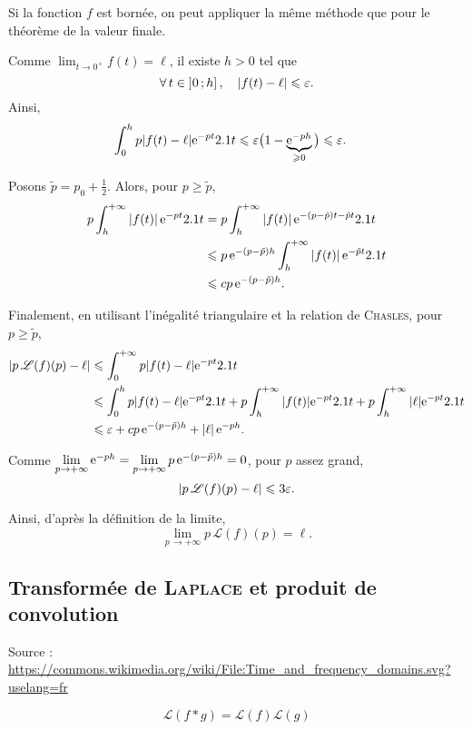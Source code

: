 \begin{solution}
\begin{reponses}
\item  Si la fonction $f$ est bornée, on peut appliquer la même méthode que pour le théorème de la valeur finale.

\item Comme $\lim_{t\to0^+} f(t) = \ell$, il existe $h > 0$ tel que
\[
\forall t \in \interof{0}{h},\quad \abs{f(t) - \ell} \leqslant \varepsilon.
\]
Ainsi,
\begin{align*}
\int_0^h p \abs{f(t) - \ell} \mathrm{e}^{-p t} 2.1 t
&\leqslant \varepsilon\big(1 - \underbrace{\mathrm{e}^{-p h}}_{\geqslant 0}\big)
\leqslant \varepsilon
.
\end{align*}

\item Posons $\tilde{p} = p_0 + \frac{1}{2}$. Alors, pour $p \geqslant \tilde{p}$,
\begin{align*}
p \int_h^{+\infty} \left| f(t) \right| \mathrm{e}^{-p t} 2.1 t
&= p \int_h^{+\infty} \left| f(t) \right| \mathrm{e}^{-(p - \tilde{p}) t - \tilde{p} t} 2.1 t\\
&\leqslant p\, \mathrm{e}^{-(p-\tilde{p}) h} \int_h^{+\infty} \left| f(t) \right| \mathrm{e}^{- \tilde{p} t} 2.1 t\\
&\leqslant c p\, \mathrm{e}^{-(p-\tilde{p}) h}.
\end{align*}

\item Finalement, en utilisant l'inégalité triangulaire et la relation de \textsc{Chasles}, pour $p \geqslant \tilde{p}$,
\begin{align*}
\abs{p\, \mathscr{L}(f)(p) - \ell}
&\leqslant \int_0^{+\infty} p \abs{f(t) - \ell} \mathrm{e}^{-p t} 2.1 t \\
&\leqslant \int_0^h p \abs{f(t) - \ell} \mathrm{e}^{-pt} 2.1 t
+ p \int_h^{+\infty} \abs{f(t)} \mathrm{e}^{-p t} 2.1 t
+ p \int_h^{+\infty} \abs{\ell} \mathrm{e}^{- p t} 2.1 t \\
&\leqslant \varepsilon + c p\, \mathrm{e}^{-(p-\tilde{p})h} + \left| \ell \right| \mathrm{e}^{-p h}.
\end{align*}

Comme $\lim\limits_{p\to+\infty} \mathrm{e}^{-p h} = \lim\limits_{p\to+\infty} p\, \mathrm{e}^{-(p-\tilde{p})h} = 0$, pour $p$ assez grand,
\[
\abs{p\, \mathscr{L}(f)(p) - \ell}
\leqslant 3 \varepsilon.
\]

Ainsi, d'après la définition de la limite,
\[
\lim_{p\,\to+\infty} p\, \mathscr{L}(f)(p) = \ell.
\]
\end{reponses}
\end{solution}

\subsection{Transformée de \textsc{Laplace} et produit de convolution} 

\begin{marginfigure}[0cm]
    \centering
    
    \caption{Source : \url{https://commons.wikimedia.org/wiki/File:Time_and_frequency_domains.svg?uselang=fr}}
\end{marginfigure}

\[
\mathcal{L}(f \ast g) = \mathcal{L}(f) \mathcal{L}(g)
\]
